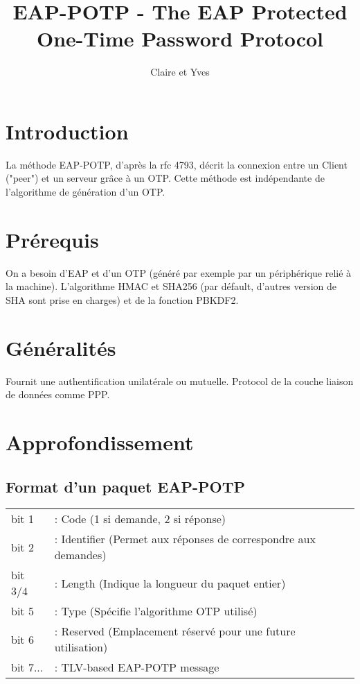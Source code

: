 \documentclass{article}
\title{EAP-POTP - The EAP Protected One-Time Password Protocol}
\author{Claire et Yves}
\begin{document}
\maketitle

\newpage
\tableofcontents
\newpage

\section{Introduction}
La méthode EAP-POTP, d'après la rfc 4793, décrit la connexion entre un Client ("peer") et un serveur grâce à un OTP.
Cette méthode est indépendante de l'algorithme de génération d'un OTP.

\section{Prérequis}
On a besoin d'EAP et d'un OTP (généré par exemple par un périphérique relié à la machine).
L'algorithme HMAC et SHA256 (par défault, d'autres version de SHA sont prise en charges) et de la fonction PBKDF2.

\section{Généralités}
Fournit une authentification unilatérale ou mutuelle.
Protocol de la couche liaison de données comme PPP.

\section{Approfondissement}

\subsection{Format d'un paquet EAP-POTP}

\begin{tabular}{  l  l  }
	bit 1 &: Code (1 si demande, 2 si réponse)\\
	bit 2 &: Identifier (Permet aux réponses de correspondre aux demandes)\\
	bit 3/4 &: Length (Indique la longueur du paquet entier)\\
	bit 5 &: Type (Spécifie l'algorithme OTP utilisé)\\
	bit 6 &: Reserved (Emplacement réservé pour une future utilisation)\\
	bit 7... &: TLV-based EAP-POTP message \\
\end{tabular}
\end{document}
